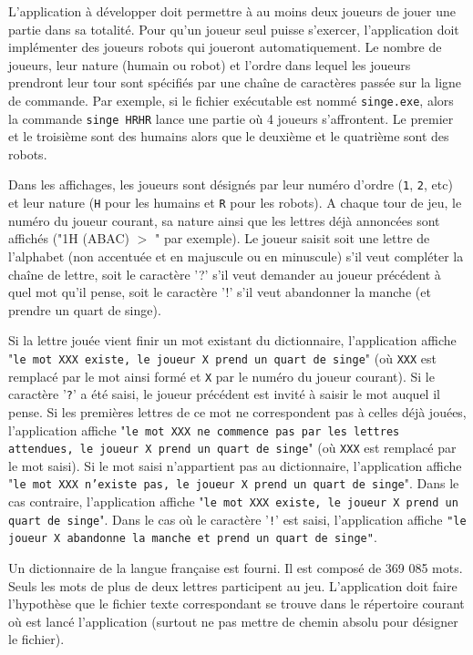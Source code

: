 \documentclass[10pt,a4paper,oneside]{article}
\begin{document}
L'application à développer doit permettre à au moins deux joueurs de jouer une partie dans sa totalité. Pour qu'un joueur seul puisse s'exercer, l'application doit implémenter des joueurs robots qui joueront automatiquement. Le nombre de joueurs, leur nature (humain ou robot) et l'ordre dans lequel les joueurs prendront leur tour sont spécifiés par une chaîne de caractères passée sur la ligne de commande. Par exemple, si le fichier exécutable est nommé \texttt{singe.exe}, alors la commande \texttt{singe HRHR} lance une partie où 4 joueurs s'affrontent. Le premier et le troisième sont des humains alors que le deuxième et le quatrième sont des robots.

\medskip

Dans les affichages, les joueurs sont désignés par leur numéro d'ordre (\texttt{1}, \texttt{2}, etc) et leur nature (\texttt{H} pour les humains et \texttt{R} pour les robots). A chaque tour de jeu, le numéro du joueur courant, sa nature ainsi que les lettres déjà annoncées sont affichés ("1H (ABAC) $>$ " par exemple). Le joueur saisit soit une lettre de l'alphabet (non accentuée et en majuscule ou en minuscule) s'il veut compléter la chaîne de lettre, soit le caractère '?' s'il veut demander au joueur précédent à quel mot qu'il pense, soit le caractère '!' s'il veut abandonner la manche (et prendre un quart de singe).

\medskip

Si la lettre jouée vient finir un mot existant du dictionnaire, l'application affiche "\texttt{le mot XXX existe, le joueur X prend un quart de singe}" (où \texttt{XXX} est remplacé par le mot ainsi formé et \texttt{X} par le numéro du joueur courant). Si le caractère '\texttt{?}' a été saisi, le joueur précédent est invité à saisir le mot auquel il pense. Si les premières lettres de ce mot ne correspondent pas à celles déjà jouées, l'application affiche "\texttt{le mot XXX ne commence pas par les lettres attendues, le joueur X prend un quart de singe}" (où \texttt{XXX} est remplacé par le mot saisi). Si le mot saisi n'appartient pas au dictionnaire, l'application affiche "\texttt{le mot XXX n'existe pas, le joueur X prend un quart de singe}". Dans le cas contraire, l'application affiche "\texttt{le mot XXX existe, le joueur X prend un quart de singe}". Dans le cas où le caractère '\texttt{!}' est saisi, l'application affiche \texttt{"le joueur X abandonne la manche et prend un quart de singe"}.

\medskip

Un dictionnaire de la langue française est fourni. Il est composé de 369 085 mots. Seuls les mots de plus de deux lettres participent au jeu. L'application doit faire l'hypothèse que le fichier texte correspondant se trouve dans le répertoire courant où est lancé l'application (surtout ne pas mettre de chemin absolu pour désigner le fichier).
\end{document}
